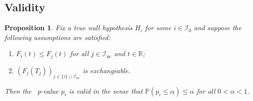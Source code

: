 \documentclass[a4paper,11pt]{article}
\theoremstyle{plain}
\newtheorem{proposition}{Proposition}[section]
\theoremstyle{definition}
\def\PP{\mathbb{P}}
\def\RR{\mathbb{R}}
\def\calI{\mathcal{I}}
\def\1{\mathbbm{1}}
\theoremstyle{plain}
\newcommand{\NoNc}{m}
\newcommand{\pval}[1]{{p_{#1}}}
\newcommand{\testStatistics}[1]{{T_{#1}}}
\newcommand{\cdfTestStatistics}[1]{{F_{#1}}}
\newcommand{\ncTestStatistics}[1]{{C_{#1}}}
\newcommand{\nickname}{{\text{RANC}}}
\newcommand{\hypothesis}[1]{{H_{#1}}}
\newcommand{\hypothesisIndex}[1]{{\calI_{#1}}}
\newcommand{\nullHypothesisIndex}{{\calI_{0}}}
\begin{document}

\subsection{Validity}\label{sec:validity}



\begin{proposition}\label{prop:pvalue.validity}
Fix a true null hypothesis $\hypothesis{i}$ for some $i \in
\nullHypothesisIndex$ and suppose the following assumptions are
satisfied:
\begin{enumerate}[label = (\alph*), ref = (\alph*)]
    \item \label{vali:assu:null.nc.conservative.general}
      $\cdfTestStatistics{i}(t) \le \cdfTestStatistics{j}(t)$ for all $j
      \in \hypothesisIndex{\text{nc}}$ and $t \in \RR$;
    \item \label{vali:assu:one.exchangeable.general}
      $(\cdfTestStatistics{j}(\testStatistics{j}))_{j \in \{i\} \cup
        \hypothesisIndex{\text{nc}}}$ is exchangeable.
\end{enumerate}
Then the \nickname~p-value $\pval{i}$ is valid in the sense
that $\PP(\pval{i} \leq \alpha) \leq \alpha$ for all $0 < \alpha < 1$.
\end{proposition}
\end{document}
